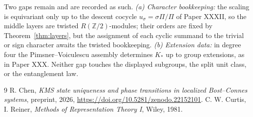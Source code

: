 \documentclass[11pt]{amsart}
\theoremstyle{remark}
\newcommand{\Z}{\mathbb{Z}}
\begin{document}
Two gaps remain and are recorded as such. \emph{(a) Character bookkeeping:} the scaling
is equivariant only up to the descent cocycle $u_\sigma=\sigma\Pi/\Pi$ of Paper XXXII,
so the middle layers are twisted $R(\Z/2)$-modules; their orders are fixed by
Theorem~\ref{thm:layers}, but the assignment of each cyclic summand to the trivial or
sign character awaits the twisted bookkeeping. \emph{(b) Extension data:} in degree four
the Pimsner--Voiculescu assembly determines $K_*$ up to group extensions, as in Paper
XXX. Neither gap touches the displayed subgroups, the split unit class, or the
entanglement law.

\begin{thebibliography}{9}
 R. Chen, \emph{KMS state uniqueness and phase transitions in localized Bost--Connes systems}, preprint, 2026, \newline\url{https://doi.org/10.5281/zenodo.22152101}.
 C. W. Curtis, I. Reiner, \emph{Methods of Representation Theory I}, Wiley, 1981.
\end{thebibliography}
\end{document}
